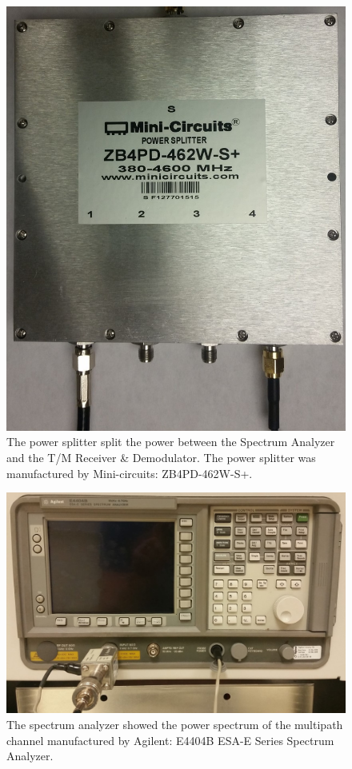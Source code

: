 \begin{figure}
	\centering\includegraphics[scale=0.5]{figures/eq_GPUimplementation/splitter.jpg}
	\caption{The power splitter split the power between the Spectrum Analyzer and the T/M Receiver \& Demodulator. The power splitter was manufactured by Mini-circuits: ZB4PD-462W-S+.}
	\label{fig:splitter}
\end{figure}
\begin{figure}
	\centering\includegraphics[scale=0.5]{figures/eq_GPUimplementation/specAn.jpg}
	\caption{The spectrum analyzer showed the power spectrum of the multipath channel manufactured by Agilent: E4404B ESA-E Series Spectrum Analyzer.}
	\label{fig:specAn}
\end{figure}
